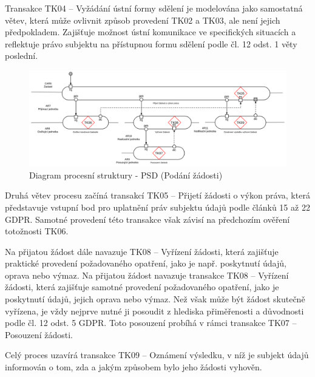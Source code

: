 \begin{itemize}
  Transakce TK04 – Vyžádání ústní formy sdělení je modelována jako samostatná větev, která může ovlivnit způsob provedení TK02 a TK03, ale není jejich předpokladem. Zajišťuje možnost ústní komunikace ve specifických situacích a reflektuje právo subjektu na přístupnou formu sdělení podle čl. 12 odst. 1 věty poslední.

  \begin{figure}[H]
    \centering
    \includegraphics[width=\textwidth]{images/demo_psd_zadost.png}
    \caption{Diagram procesní struktury - PSD (Podání žádosti)}
    \label{fig:demo_psd_zadost}
  \end{figure}

  Druhá větev procesu začíná transakcí TK05 – Přijetí žádosti o výkon práva, která představuje vstupní bod pro uplatnění práv subjektu údajů podle článků 15 až 22 GDPR. Samotné provedení této transakce však závisí na předchozím ověření totožnosti TK06.

  Na přijatou žádost dále navazuje TK08 – Vyřízení žádosti, která zajišťuje praktické provedení požadovaného opatření, jako je např. poskytnutí údajů, oprava nebo výmaz. Na přijatou žádost navazuje transakce TK08 – Vyřízení žádosti, která zajišťuje samotné provedení požadovaného opatření, jako je poskytnutí údajů, jejich oprava nebo výmaz. Než však může být žádost skutečně vyřízena, je vždy nejprve nutné ji posoudit z hlediska přiměřenosti a důvodnosti podle čl. 12 odst. 5 GDPR. Toto posouzení probíhá v rámci transakce TK07 – Posouzení žádosti.

  Celý proces uzavírá transakce TK09 – Oznámení výsledku, v níž je subjekt údajů informován o tom, zda a jakým způsobem bylo jeho žádosti vyhověn. 

\end{itemize}


